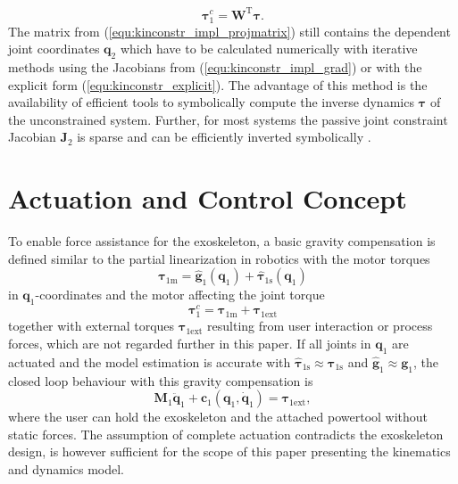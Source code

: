 \documentclass[twocolumn,10pt]{IFTOMM}
\newcommand{\bm}[1]{\boldsymbol{#1}}
\newcommand{\transp}[0]{{\mathrm{T}}}
\begin{document}
%
\begin{equation}
\bm{\tau}^{c}_{1} = \bm{W}^\transp \bm{\tau}.
\label{equ:tau_projection}
\end{equation}
%
The matrix from (\ref{equ:kinconstr_impl_projmatrix}) still contains the dependent joint coordinates $\bm{q}_2$ which have to be calculated numerically with iterative methods using the Jacobians from (\ref{equ:kinconstr_impl_grad}) or with the explicit form (\ref{equ:kinconstr_explicit}).
The advantage of this method is the availability of efficient tools to symbolically compute the inverse dynamics $\bm{\tau}$ of the unconstrained system.
Further, for most systems the passive joint constraint Jacobian $\bm{J}_2$ is sparse and can be efficiently inverted symbolically \cite{ParkChoPlo1999}.

\section{Actuation and Control Concept}
\label{sec:actuation_control}

To enable force assistance for the exoskeleton, a basic gravity compensation is defined similar to the partial linearization in robotics with the motor torques
%
\begin{equation}
\bm{\tau}_{1\mathrm{m}} = \hat{\bm{g}}_1(\bm{q}_1) + \hat{\bm{\tau}}_{1\mathrm{s}}(\bm{q}_1)
\label{equ:GravKomp}
\end{equation}
%
in $\bm{q}_1$-coordinates and the motor affecting the joint torque
%
\begin{equation}
\bm{\tau}^c_1 = \bm{\tau}_{1\mathrm{m}} + \bm{\tau}_{1\mathrm{ext}}
\label{equ:JointTorque}
\end{equation}
%
together with external torques $\bm{\tau}_{1\mathrm{ext}}$ resulting from user interaction or process forces, which are not regarded further in this paper.
If all joints in $\bm{q}_1$ are actuated and the model estimation is accurate with $\hat{\bm{\tau}}_{1\mathrm{s}} \approx \bm{\tau}_{1\mathrm{s}}$ and $\hat{\bm{g}}_{1} \approx \bm{g}_{1}$, the closed loop behaviour with this gravity compensation is
%
\begin{equation}
\bm{M}_1\ddot{\bm{q}}_1+\bm{c}_1(\bm{q}_1,\dot{\bm{q}}_1) = \bm{\tau}_{1\mathrm{ext}},
\label{equ:closedloop}
\end{equation}
%
where the user can hold the exoskeleton and the attached powertool without static forces.
The assumption of complete actuation contradicts the exoskeleton design, is however sufficient for the scope of this paper presenting the kinematics and dynamics model.
\end{document}
